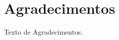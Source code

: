 
\chapter*{Agradecimentos}

{\setlength{\parindent}{0cm}

Texto de Agradecimentos.

}
\thispagestyle{empty}

